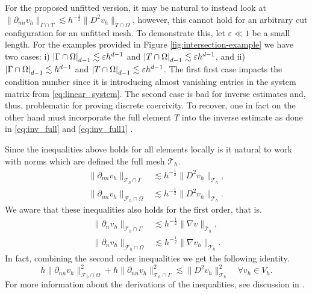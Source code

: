 For the proposed unfitted version, it may be natural to instead look at $\| \partial _{nn} v_{h} \|_{ \Gamma \cap T  }^{  } \lesssim h^{-\frac{1}{2}} \| D^2 v_{h} \|_{ T\cap \Omega  }^{  }$, however, this cannot hold for an arbitrary cut
configuration for an unfitted mesh. To demonstrate this, let $\varepsilon \ll 1$ be a small length. For the examples provided in
    Figure \ref{fig:intersection-example} we have two cases: i) $\left\lvert  \Gamma \cap \Omega   \right\rvert_{d-1} \lesssim \varepsilon h^{d-1}  $ and $\left\lvert  T \cap \Omega   \right\rvert_{d-1} \lesssim \varepsilon h^{d-1}  $, and ii)
    $\left\lvert  \Gamma \cap \Omega   \right\rvert_{d-1} \lesssim  h^{d-1}  $ and $\left\lvert  T \cap \Omega   \right\rvert_{d-1} \lesssim \varepsilon h^{d-1}  $.
    The first first case impacts the condition number since it is introducing almost vanishing entries in the system matrix from \eqref{eq:linear_system}.
    The second case is bad for inverse estimates and, thus, problematic for proving discrete coercivity. To recover, one in fact on the other hand must incorporate the full element $T$ into the inverse estimate as done in \eqref{eq:inv_full} and \eqref{eq:inv_full1} .


Since the inequalities above holds for all elements locally is it natural to work with norms which are defined  the full mesh  $\mathcal{T}_{h} $.
\begin{align}
\label{eq:bi_cut_inverse_1}
\| \partial _{nn} v_h \|_{ \mathcal{T} _{h} \cap \Gamma  }^{  } &\lesssim h^{-\frac{1}{2}} \| D^2 v_h \|_{ \mathcal{T}_h }^{  }, \\
\label{eq:bi_cut_inverse_2}
\| \partial _{nn}  v_h \|_{ \mathcal{F}_h \cap \Omega    }^{  }  &  \lesssim   h^{-\frac{1}{2}} \| D^2 v_h \|_{ \mathcal{T}_h  }^{  }.
\end{align}
    We aware that these inequalities also holds for the first order, that is.
\begin{align}
\label{eq:bi_n_cut_inverse_1}
\| \partial _{n} v_h \|_{ \mathcal{T} _{h} \cap \Gamma  }^{  } &\lesssim h^{-\frac{1}{2}} \| \nabla v \|_{ \mathcal{T}_h }^{  }, \\
\label{eq:bi_n_cut_inverse_2}
\| \partial _{n}  v_h \|_{ \mathcal{F}_h \cap \Omega    }^{  }  &  \lesssim   h^{-\frac{1}{2}} \| \nabla v_h \|_{ \mathcal{T}_h  }^{  }.
\end{align}
In fact, combining the second order inequalities we get the following identity.
\begin{equation}
\label{eq:bi_identity}
h\| \partial _{nn}  v_{h} \|_{ \mathcal{F}_h \cap \Omega    }^{2 } + h\| \partial _{nn} v_{h} \|_{ \mathcal{T} _{h} \cap \Gamma  }^{2  } \lesssim \| D^2 v_{h} \|_{ \mathcal{T} _{h}  }^{2  } \quad  \forall v_{h} \in V_{h}.
\end{equation}
For more information about the derivations of the inequalities, see discussion in \cite[Section 2.4]{gurkan2019stabilized}.

